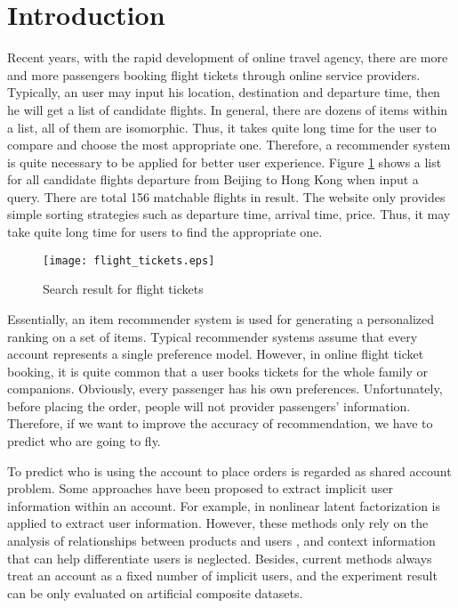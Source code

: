 \documentclass{llncs}
\begin{document}
\section{Introduction}
\label{sec:intro}
Recent years, with the rapid development of online travel agency, there are more and more passengers booking flight tickets through online service providers. Typically, an user may input his location, destination and departure time, then he will get a list of candidate flights. In general, there are dozens of items within a list, all of them are isomorphic. Thus, it takes quite long time for the user to compare and choose the most appropriate one. Therefore, a recommender system is quite necessary to be applied for better user experience. Figure \ref{fig:res} shows a list for all candidate flights departure from Beijing to Hong Kong when input a query. There are total 156 matchable flights in result. The website only provides simple sorting strategies such as departure time, arrival time, price. Thus, it may take quite long time for users to find the appropriate one.
\begin{figure}[!hbt]
\centering
\texttt{[image: flight\_tickets.eps]}
\caption{Search result for flight tickets}
\label{fig:res}
\end{figure}\par
Essentially, an item recommender system is used for generating a personalized ranking on a set of items\cite{lv:rec}. Typical recommender systems assume that every account represents a single preference model. However, in online flight ticket booking, it is quite common that a user books tickets for the whole family or companions.  Obviously, every passenger has his own preferences. Unfortunately, before placing the order, people will not provider passengers' information.  Therefore, if we want to improve the accuracy of recommendation, we have to predict who are going to fly.  \par
 To predict who is using the account to place orders is regarded as shared account problem. Some approaches have been proposed to extract implicit user information within an account. For example,  in \cite{kabbur:nlmf}\cite{jason:embedding} nonlinear latent factorization is applied to  extract user information. However, these methods only rely on the analysis of relationships between products and users \cite{koen:top-n}\cite{yutaka:modeling}, and context information that can help differentiate users is neglected. Besides, current methods always treat an account as a fixed number of implicit users, and the experiment result can be only evaluated on artificial composite datasets. 
\end{document}
